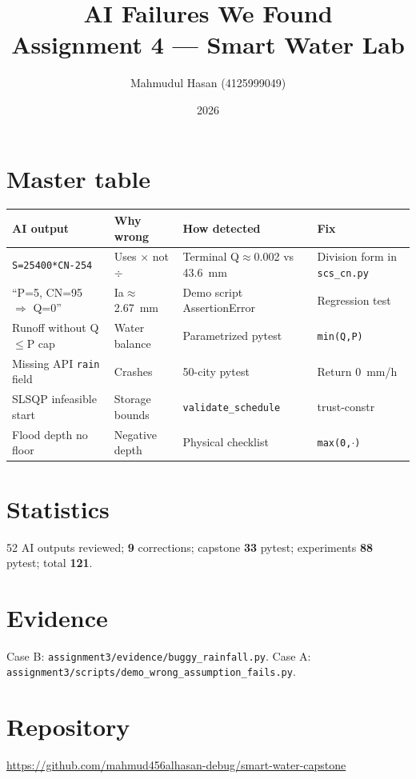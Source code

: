 \documentclass[11pt,a4paper]{article}
\title{AI Failures We Found\\Assignment 4 --- Smart Water Lab}
\author{Mahmudul Hasan (4125999049)}
\date{2026}
\begin{document}
\maketitle

\section{Master table}

\begin{tabular}{@{}p{3.2cm}p{3.2cm}p{2.8cm}p{3.5cm}@{}}
\toprule
AI output & Why wrong & How detected & Fix \\
\midrule
\texttt{S=25400*CN-254} & Uses $\times$ not $\div$ & Terminal Q$\approx$0.002 vs 43.6~mm & Division form in \texttt{scs\_cn.py} \\
``P=5, CN=95 $\Rightarrow$ Q=0'' & Ia$\approx$2.67~mm & Demo script AssertionError & Regression test \\
Runoff without Q$\le$P cap & Water balance & Parametrized pytest & \texttt{min(Q,P)} \\
Missing API \texttt{rain} field & Crashes & 50-city pytest & Return 0~mm/h \\
SLSQP infeasible start & Storage bounds & \texttt{validate\_schedule} & trust-constr \\
Flood depth no floor & Negative depth & Physical checklist & \texttt{max(0,$\cdot$)} \\
\bottomrule
\end{tabular}

\section{Statistics}
52 AI outputs reviewed; \textbf{9} corrections; capstone \textbf{33} pytest; experiments \textbf{88} pytest; total \textbf{121}.

\section{Evidence}
Case B: \texttt{assignment3/evidence/buggy\_rainfall.py}. Case A: \texttt{assignment3/scripts/demo\_wrong\_assumption\_fails.py}.

\section{Repository}
\url{https://github.com/mahmud456alhasan-debug/smart-water-capstone}
\end{document}

